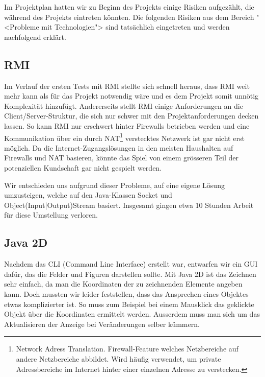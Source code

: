 \documentclass[12pt,halfparskip]{scrartcl}
\begin{document}
Im Projektplan hatten wir zu Beginn des Projekts einige Risiken aufgezählt, die während des Projekts eintreten könnten. Die folgenden Risiken aus dem Bereich "<Probleme mit Technologien"> sind tatsächlich eingetreten und werden nachfolgend erklärt.


\subsection{RMI}
\label{sub:rmi}

Im Verlauf der ersten Tests mit RMI stellte sich schnell heraus, dass RMI weit mehr kann als für das Projekt notwendig wäre und es dem Projekt somit unnötig Komplexität hinzufügt. Andererseits stellt RMI  einige Anforderungen an die Client/Server-Struktur, die sich nur schwer mit den Projektanforderungen decken lassen. So kann RMI nur erschwert hinter Firewalls betrieben werden und eine Kommunikation über ein durch NAT\footnote{Network Adress Translation. Firewall-Feature welches Netzbereiche auf andere Netzbereiche abbildet. Wird häufig verwendet, um private Adressbereiche im Internet hinter einer einzelnen Adresse zu verstecken.} verstecktes Netzwerk ist gar nicht erst möglich. Da die Internet-Zugangslösungen in den meisten Haushalten auf Firewalls und NAT basieren, könnte das Spiel von einem grösseren Teil der potenziellen Kundschaft gar nicht gespielt werden.

Wir entschieden uns aufgrund dieser Probleme, auf eine eigene Lösung umzusteigen, welche auf den Java-Klassen Socket und Object(Input|Output)Stream basiert. Insgesamt gingen etwa 10 Stunden Arbeit für diese Umstellung verloren.

\subsection{Java 2D}
\label{java_2d}

Nachdem das CLI (Command Line Interface) erstellt war, entwarfen wir ein GUI dafür, das die Felder und Figuren darstellen sollte. Mit Java 2D ist das Zeichnen sehr einfach, da man die Koordinaten der zu zeichnenden Elemente angeben kann. Doch mussten wir leider feststellen, dass das Ansprechen eines Objektes etwas komplizierter ist. So muss zum Beispiel bei einem Mausklick das geklickte Objekt über die Koordinaten ermittelt werden. Ausserdem muss man sich um das Aktualisieren der Anzeige bei Veränderungen selber kümmern.
\end{document}

